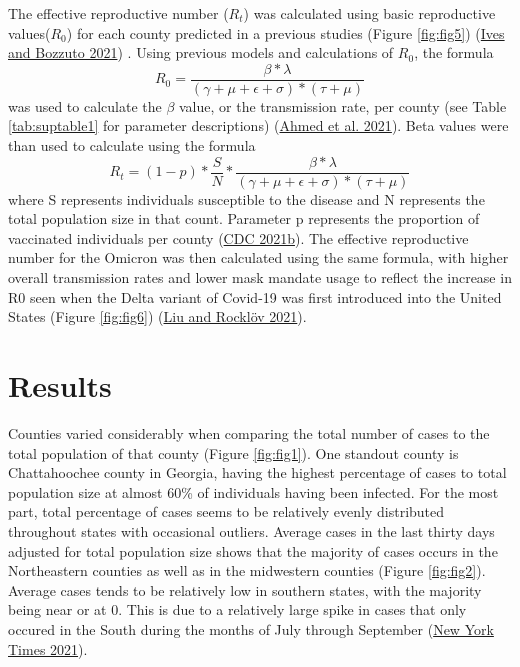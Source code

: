 \documentclass[
  12pt,
]{article}
\begin{document}
The effective reproductive number (\(R_t\)) was calculated using basic reproductive values(\(R_0\)) for each county predicted in a previous studies (Figure \ref{fig:fig5}) (\protect\hyperlink{ref-ives_estimating_2021}{Ives and Bozzuto 2021}) . Using previous models and calculations of \(R_0\), the formula
\[R_0 = \frac{\beta*\lambda}{(\gamma+\mu+\epsilon+\sigma)*(\tau+\mu)}\]
was used to calculate the \(\beta\) value, or the transmission rate, per county (see Table \ref{tab:suptable1} for parameter descriptions) (\protect\hyperlink{ref-ahmed_mathematical_2021}{Ahmed et al. 2021}). Beta values were than used to calculate using the formula
\[R_t = (1-p)*\frac{S}{N}*\frac{\beta*\lambda}{(\gamma+\mu+\epsilon+\sigma)*(\tau+\mu)}\]
where S represents individuals susceptible to the disease and N represents the total population size in that count. Parameter p represents the proportion of vaccinated individuals per county (\protect\hyperlink{ref-cdc_covid-19_2021}{CDC 2021b}). The effective reproductive number for the Omicron was then calculated using the same formula, with higher overall transmission rates and lower mask mandate usage to reflect the increase in R0 seen when the Delta variant of Covid-19 was first introduced into the United States (Figure \ref{fig:fig6}) (\protect\hyperlink{ref-liu_reproductive_2021}{Liu and Rocklöv 2021}).

\hypertarget{results}{%
\section{Results}\label{results}}

Counties varied considerably when comparing the total number of cases to the total population of that county (Figure \ref{fig:fig1}). One standout county is Chattahoochee county in Georgia, having the highest percentage of cases to total population size at almost 60\% of individuals having been infected. For the most part, total percentage of cases seems to be relatively evenly distributed throughout states with occasional outliers. Average cases in the last thirty days adjusted for total population size shows that the majority of cases occurs in the Northeastern counties as well as in the midwestern counties (Figure \ref{fig:fig2}). Average cases tends to be relatively low in southern states, with the majority being near or at 0. This is due to a relatively large spike in cases that only occured in the South during the months of July through September (\protect\hyperlink{ref-new_york_times_coronavirus_2021}{New York Times 2021}).
\end{document}
